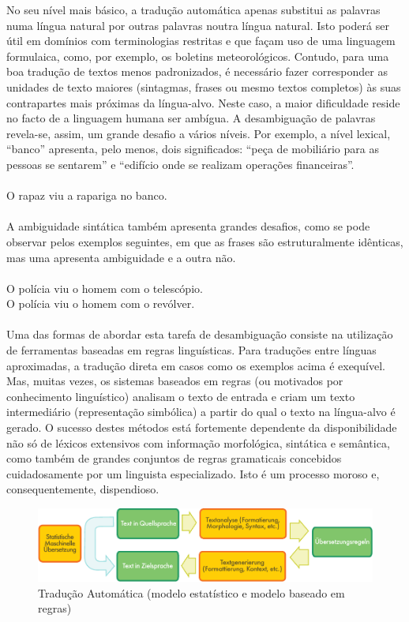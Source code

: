 \documentclass[]{../metanetpaper}
\begin{document}
\begin{multicols}{2}
No seu nível mais básico, a tradução automática apenas substitui as palavras numa língua natural por outras palavras noutra língua natural. Isto poderá ser útil em domínios com terminologias restritas e que façam uso de uma linguagem formulaica, como, por exemplo, os boletins meteorológicos. Contudo, para uma boa tradução de textos menos padronizados, é necessário fazer corresponder as unidades de texto maiores (sintagmas, frases ou mesmo textos completos) às suas contrapartes mais próximas da língua-alvo. Neste caso, a maior dificuldade reside no facto de a linguagem humana ser ambígua. A desambiguação de palavras revela-se, assim, um grande desafio a vários níveis. Por exemplo, a nível lexical, “banco” apresenta, pelo menos, dois significados: “peça de mobiliário para as pessoas se sentarem” e “edifício onde se realizam operações financeiras”.\\
\\
O rapaz viu a rapariga no banco. \\
\\
A ambiguidade sintática também apresenta grandes desafios, como se pode observar pelos exemplos seguintes, em que as frases são estruturalmente idênticas, mas uma apresenta ambiguidade e a outra não.\\
\\
O polícia viu o homem com o telescópio.\\
O polícia viu o homem com o revólver.\\
\\
Uma das formas de abordar esta tarefa de desambiguação consiste na utilização de ferramentas baseadas em regras linguísticas. Para traduções entre línguas aproximadas, a tradução direta em casos como os exemplos acima é exequível. Mas, muitas vezes, os sistemas baseados em regras (ou motivados por conhecimento linguístico) analisam o texto de entrada e criam um texto intermediário (representação simbólica) a partir do qual o texto na língua-alvo é gerado. O sucesso destes métodos está fortemente dependente da disponibilidade não só de lé\-xi\-cos extensivos com informação morfológica, sintática e semântica, como também de grandes conjuntos de regras gramaticais concebidos cuidadosamente por um linguista especializado. Isto é um processo moroso e, consequentemente, dispendioso.

\begin{figure}[htb]
  \center
  \includegraphics[width=\textwidth]{../_media/german/machine_translation}
  \caption{Tradução Automática (modelo estatístico e modelo baseado em regras)}
  \label{fig:mtarch_de}
\end{figure}


\end{multicols}
\end{document}
